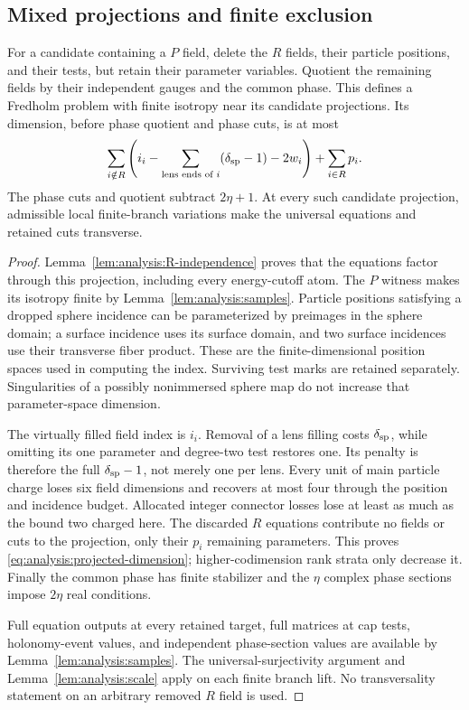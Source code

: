 \subsection{Mixed projections and finite exclusion}

\begin{lemma}
\label{lem:analysis:projection}
For a candidate containing a $P$ field, delete the $R$ fields, their
particle positions, and their tests, but retain their parameter
variables.  Quotient the remaining fields by their independent gauges
and the common phase.  This defines a Fredholm problem with finite
isotropy near its candidate projections.  Its dimension, before phase
quotient and phase cuts, is at most
\begin{equation}\label{eq:analysis:projected-dimension}
 \sum_{i\notin R}\left(
 i_i-\sum_{\text{lens ends of }i}(\delta_{\rm sp}-1)-2w_i\right)
       +\sum_{i\in R}p_i.
\end{equation}
The phase cuts and quotient subtract $2\eta+1$.  At every such
candidate projection, admissible local finite-branch variations make
the universal equations and retained cuts transverse.
\end{lemma}
\begin{proof}
Lemma~\ref{lem:analysis:R-independence} proves that the equations
factor through this projection, including every energy-cutoff atom.
The $P$ witness makes its isotropy finite by
Lemma~\ref{lem:analysis:samples}.  Particle positions satisfying a
dropped sphere incidence can be parameterized by preimages in the
sphere domain; a surface incidence uses its surface domain, and two
surface incidences use their transverse fiber product.  These are the
finite-dimensional position spaces used in computing the index.
Surviving test marks are retained separately.  Singularities of a
possibly nonimmersed sphere map do not increase that parameter-space
dimension.

The virtually filled field index is $i_i$.  Removal of a lens filling
costs $\delta_{\rm sp}$, while omitting its one parameter and degree-two
test restores one.  Its penalty is therefore the full
$\delta_{\rm sp}-1$, not merely one per lens.  Every unit of main
particle charge loses six field dimensions and recovers at most four
through the position and incidence budget.  Allocated integer
connector losses lose at least as much as the bound two charged here.
The discarded $R$ equations contribute no fields or cuts to the
projection, only their $p_i$ remaining parameters.  This proves
\eqref{eq:analysis:projected-dimension}; higher-codimension rank strata
only decrease it.  Finally the common phase has finite stabilizer and
the $\eta$ complex phase sections impose $2\eta$ real conditions.

Full equation outputs at every retained target, full matrices at cap
tests, holonomy-event values, and independent phase-section values
are available by Lemma~\ref{lem:analysis:samples}.  The
universal-surjectivity argument and Lemma~\ref{lem:analysis:scale}
apply on each finite branch lift.  No transversality statement on an
arbitrary removed $R$ field is used.
\end{proof}

